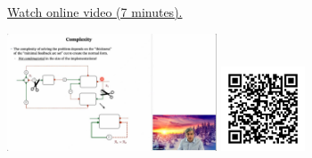 
\begin{minipage}{10cm}
    \href{https://act4e-spring21.netlify.app/videos/spring2021-functorial-comp-b:solving-queries:complexity.html}{Watch online video (7 minutes).}
        
    \href{https://act4e-spring21.netlify.app/videos/spring2021-functorial-comp-b:solving-queries:complexity.html}{\includegraphics[height=3.5cm]{spring2021-functorial-comp-b:solving-queries:complexity/thumbnails.jpg}}
    \href{https://act4e-spring21.netlify.app/videos/spring2021-functorial-comp-b:solving-queries:complexity.html}{\includegraphics[height=2.5cm]{spring2021-functorial-comp-b:solving-queries:complexity/qrcode.png}}
\end{minipage}
